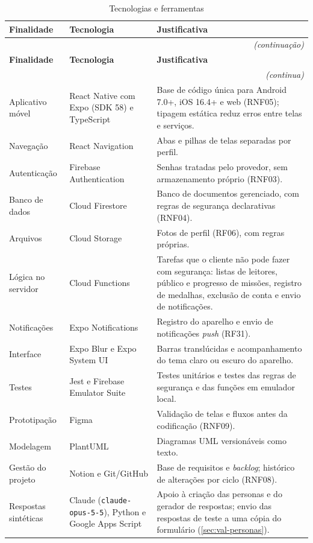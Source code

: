 \begin{quadrolongo}
\begin{longtable}{|p{3.2cm}|p{4.0cm}|p{6.0cm}|}
  \caption{Tecnologias e ferramentas}\label{qua:tecnologias}\\
  \hline
  \textbf{Finalidade} & \textbf{Tecnologia} & \textbf{Justificativa} \\ \hline
\endfirsthead
  \multicolumn{3}{r}{\textit{(continuação)}}\\
  \hline
  \textbf{Finalidade} & \textbf{Tecnologia} & \textbf{Justificativa} \\ \hline
\endhead
  \multicolumn{3}{r}{\textit{(continua)}}\\
\endfoot
\endlastfoot
    Aplicativo móvel & React Native com Expo (SDK 58) e TypeScript & Base de código única para Android 7.0+, iOS 16.4+ e web (RNF05); tipagem estática reduz erros entre telas e serviços. \\ \hline
    Navegação & React Navigation & Abas e pilhas de telas separadas por perfil. \\ \hline
    Autenticação & Firebase Authentication & Senhas tratadas pelo provedor, sem armazenamento próprio (RNF03). \\ \hline
    Banco de dados & Cloud Firestore & Banco de documentos gerenciado, com regras de segurança declarativas (RNF04). \\ \hline
    Arquivos & Cloud Storage & Fotos de perfil (RF06), com regras próprias. \\ \hline
    Lógica no servidor & Cloud Functions & Tarefas que o cliente não pode fazer com segurança: listas de leitores, público e progresso de missões, registro de medalhas, exclusão de conta e envio de notificações. \\ \hline
    Notificações & Expo Notifications & Registro do aparelho e envio de notificações \textit{push} (RF31). \\ \hline
    Interface & Expo Blur e Expo System UI & Barras translúcidas e acompanhamento do tema claro ou escuro do aparelho. \\ \hline
    Testes & Jest e Firebase Emulator Suite & Testes unitários e testes das regras de segurança e das funções em emulador local. \\ \hline
    Prototipação & Figma & Validação de telas e fluxos antes da codificação (RNF09). \\ \hline
    Modelagem & PlantUML & Diagramas UML versionáveis como texto. \\ \hline
    Gestão do projeto & Notion e Git/GitHub & Base de requisitos e \textit{backlog}; histórico de alterações por ciclo (RNF08). \\ \hline
    Respostas sintéticas & Claude (\texttt{claude-opus-5-5}), Python e Google Apps Script & Apoio à criação das personas e do gerador de respostas; envio das respostas de teste a uma cópia do formulário (\autoref{sec:val-personas}). \\ \hline
\end{longtable}
\end{quadrolongo}

